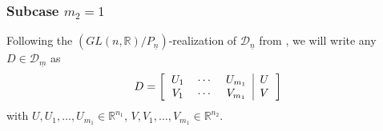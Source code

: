 \documentclass[pdftex]{sigma}
\numberwithin{equation}{section}
\theoremstyle{definition}
\newcommand{\R}{\mathbb{R}}
\newcommand{\D}{\mathcal{D}}
\theoremstyle{plain}
\theoremstyle{plain}
\theoremstyle{plain}
\theoremstyle{plain}
\begin{document}
\subsubsection*{Subcase $m_2 = 1$}

Following the $(GL(n,\R)/P_{\underline n})$-realization of $\D_{\underline n}$ from , we will write any $D \in \D_{\underline m}$ as
\begin{equation*}
	D = \left[\begin{tabular}{ccc|c}
	$U_1$ & $\cdots$ & $U_{m_1}$ & $U$ \\
	$V_1$ & $\cdots$ & $V_{m_1}$ & $V$
\end{tabular}\right]
\end{equation*}
with $U,U_1,\dots, U_{m_1} \in \R^{n_1}$, $V,V_1,\dots,V_{m_1} \in \R^{n_2}$.
\end{document}
